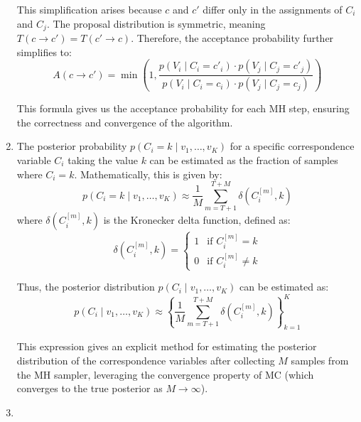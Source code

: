 \documentclass[a4 paper]{article}
\begin{document}
\begin{enumerate}
    This simplification arises because \( c \) and \( c' \) differ only in the assignments of \( C_i \) and \( C_j \). The proposal distribution is symmetric, meaning \( T(c \to c') = T(c' \to c) \). Therefore, the acceptance probability further simplifies to:
    \[
    A(c \to c') = \min \left( 1, \frac{p(V_i \mid C_i = c'_i) \cdot p(V_j \mid C_j = c'_j)}{p(V_i \mid C_i = c_i) \cdot p(V_j \mid C_j = c_j)} \right)
    \]

    This formula gives us the acceptance probability for each MH step, ensuring the correctness and convergence of the algorithm.

    
    \newpage
    \item {}
       
    The posterior probability \( p(C_i = k \mid v_1, \ldots, v_K) \) for a specific correspondence variable \( C_i \) taking the value \( k \) can be estimated as the fraction of samples where \( C_i = k \). Mathematically, this is given by:
    \[
    p(C_i = k \mid v_1, \ldots, v_K) \approx \frac{1}{M} \sum_{m=T+1}^{T+M} \delta(C_i^{[m]}, k)
    \]
    where \( \delta(C_i^{[m]}, k) \) is the Kronecker delta function, defined as:
    \[
    \delta(C_i^{[m]}, k) =
    \begin{cases}
    1 & \text{if } C_i^{[m]} = k \\
    0 & \text{if } C_i^{[m]} \neq k
    \end{cases}
    \]

    Thus, the posterior distribution \( p(C_i \mid v_1, \ldots, v_K) \) can be estimated as:
    \[
    p(C_i \mid v_1, \ldots, v_K) \approx \left\{ \frac{1}{M} \sum_{m=T+1}^{T+M} \delta(C_i^{[m]}, k) \right\}_{k=1}^{K}
    \]

    This expression gives an explicit method for estimating the posterior distribution of the correspondence variables after collecting \( M \) 
    samples from the MH sampler, leveraging the convergence property of MC (which converges to the true posterior as \( M \to \infty \)).


    \item {}
    

\end{enumerate}
\end{document}
